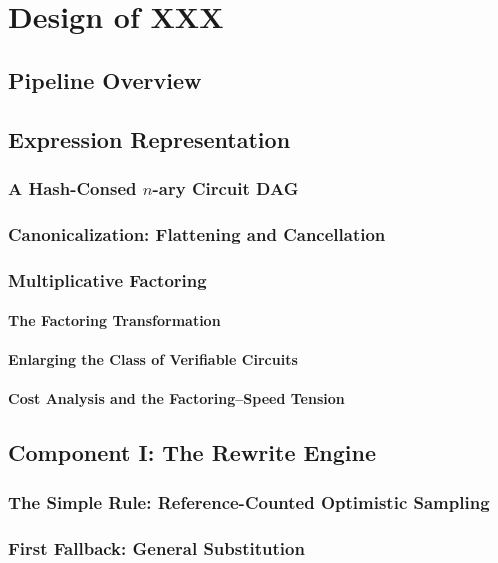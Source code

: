 \chapter{Design of XXX}
\section{Pipeline Overview}
\section{Expression Representation}
  \subsection{A Hash-Consed $n$-ary Circuit DAG}
  \subsection{Canonicalization: Flattening and Cancellation}
  \subsection{Multiplicative Factoring}
    \subsubsection{The Factoring Transformation}
    \subsubsection{Enlarging the Class of Verifiable Circuits}
    \subsubsection{Cost Analysis and the Factoring--Speed Tension}
\section{Component I: The Rewrite Engine}
  \subsection{The Simple Rule: Reference-Counted Optimistic Sampling}
  \subsection{First Fallback: General Substitution}
